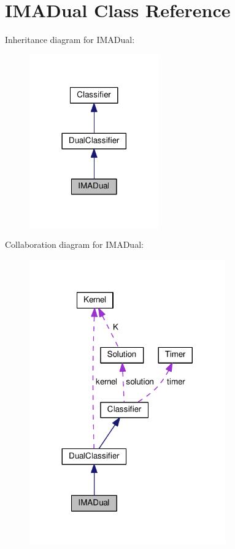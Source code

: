 \hypertarget{class_i_m_a_dual}{}\section{I\+M\+A\+Dual Class Reference}
\label{class_i_m_a_dual}


Inheritance diagram for I\+M\+A\+Dual\+:\nopagebreak
\begin{figure}[H]
\begin{center}
\leavevmode
\includegraphics[width=158pt]{class_i_m_a_dual__inherit__graph}
\end{center}
\end{figure}


Collaboration diagram for I\+M\+A\+Dual\+:\nopagebreak
\begin{figure}[H]
\begin{center}
\leavevmode
\includegraphics[width=239pt]{class_i_m_a_dual__coll__graph}
\end{center}
\end{figure}

